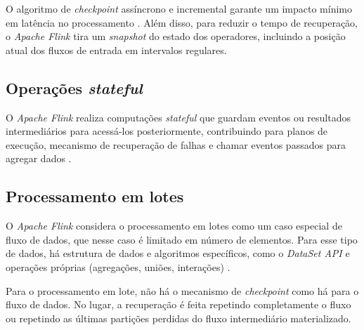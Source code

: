 O algoritmo de \emph{checkpoint} assíncrono e incremental garante um impacto mínimo em latência no processamento \cite{Carbone2015}. Além disso, para reduzir o tempo de recuperação, o \emph{Apache Flink} tira um \emph{snapshot} do estado dos operadores, incluindo a posição atual dos fluxos de entrada em intervalos regulares.

\subsection{Operações \emph{stateful}}
O \emph{Apache Flink} realiza computações \emph{stateful} que guardam eventos ou resultados intermediários para acessá-los posteriormente, contribuindo para planos de execução, mecanismo de recuperação de falhas e chamar eventos passados para agregar dados \cite{ApacheFlink2020, Carbone2015}.

\subsection{Processamento em lotes}
O \emph{Apache Flink} considera o processamento em lotes como um caso especial de fluxo de dados, que nesse caso é limitado em número de elementos. Para esse tipo de dados, há estrutura de dados e algoritmos específicos, como o \emph{DataSet API} e operações próprias (agregações, uniões, interações) \cite{Carbone2015}.

Para o processamento em lote, não há o mecanismo de \emph{checkpoint} como há para o fluxo de dados. No lugar, a recuperação é feita repetindo completamente o fluxo ou repetindo as últimas partições perdidas do fluxo intermediário materializado.    









